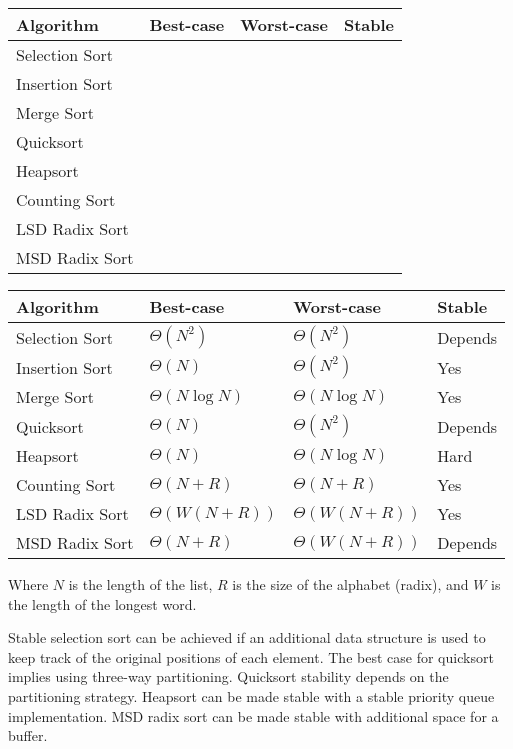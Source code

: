 \ifprintanswers\else
{
\renewcommand{\arraystretch}{2}
\setlength{\tabcolsep}{12pt}
\begin{tabularx}{\textwidth}{Xlll}
Algorithm         & Best-case & Worst-case & Stable \\\hline
Selection Sort    &           &            &        \\
Insertion Sort    &           &            &        \\
Merge Sort        &           &            &        \\
Quicksort         &           &            &        \\
Heapsort          &           &            &        \\
Counting Sort     &           &            &        \\
LSD Radix Sort    &           &            &        \\
MSD Radix Sort    &           &            &        
\end{tabularx}
}
\fi

\begin{solution}
{
\renewcommand{\arraystretch}{2}
\setlength{\tabcolsep}{12pt}
\begin{tabularx}{\textwidth}{Xlll}
Algorithm         & Best-case          & Worst-case          & Stable \\\hline
Selection Sort    & $\Theta(N^2)$      & $\Theta(N^2)$       & Depends\\
Insertion Sort    & $\Theta(N)$        & $\Theta(N^2)$       & Yes    \\
Merge Sort        & $\Theta(N \log N)$ & $\Theta(N \log N)$  & Yes    \\
Quicksort         & $\Theta(N)$        & $\Theta(N^2)$       & Depends\\
Heapsort          & $\Theta(N)$        & $\Theta(N \log N)$  & Hard   \\
Counting Sort     & $\Theta(N + R)$    & $\Theta(N + R)$     & Yes    \\
LSD Radix Sort    & $\Theta(W(N + R))$ & $\Theta(W(N + R))$  & Yes    \\
MSD Radix Sort    & $\Theta(N + R)$    & $\Theta(W(N + R))$  & Depends\\
\end{tabularx}
}

Where $N$ is the length of the list, $R$ is the size of the alphabet (radix), and $W$ is the length of the longest word.

Stable selection sort can be achieved if an additional data structure is used to keep track of the original positions of each element. The best case for quicksort implies using three-way partitioning. Quicksort stability depends on the partitioning strategy. Heapsort can be made stable with a stable priority queue implementation. MSD radix sort can be made stable with additional space for a buffer.
\end{solution}

\vspace{\parskip}